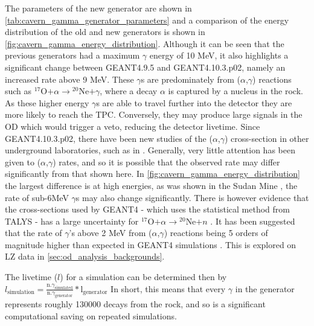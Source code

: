 \par
The parameters of the new generator are shown in \autoref{tab:cavern_gamma_generator_parameters} and a comparison of the energy distribution of the old and new generators is shown in \autoref{fig:cavern_gamma_energy_distribution}.
Although it can be seen that the previous generators had a maximum $\gamma$ energy of 10 MeV, it also highlights a significant change between GEANT4.9.5 and GEANT4.10.3.p02, namely an increased rate above 9 MeV.
These $\gamma$s are predominately from ($\alpha$,$\gamma$) reactions such as ${}^{17}$O$ + \alpha \to {}^{20}$Ne$ + \gamma$, where a decay $\alpha$ is captured by a nucleus in the rock.
As these higher energy $\gamma$s are able to travel further into the detector they are more likely to reach the TPC.
Conversely, they may produce large signals in the OD which would trigger a veto, reducing the detector livetime.
Since GEANT4.10.3.p02, there have been new studies of the ($\alpha$,$\gamma$) cross-section in other underground laboratories, such as in \cite{cavern_gammas_in_Soudan_mine_ref}.
Generally, very little attention has been given to ($\alpha$,$\gamma$) rates, and so it is possible that the observed rate may differ significantly from that shown here. 
In \autoref{fig:cavern_gamma_energy_distribution} the largest difference is at high energies, as was shown in the Sudan Mine \cite{cavern_gammas_in_Soudan_mine_ref}, the rate of sub-6MeV $\gamma$s may also change significantly. 
There is however evidence that the cross-sections used by GEANT4 - which uses the statistical method from TALYS \cite{talys_ref} - has a large uncertainty for ${}^{17}$O$ + \alpha \to {}^{20}$Ne$ + n$ \cite{alpha_gamma_statistical_error_ref}.
It has been suggested that the rate of $\gamma$'s above 2 MeV from ($\alpha$,$\gamma$) reactions being 5 orders of magnitude higher than expected in GEANT4 simulations \cite{soudanmine_counter_point_ref, alpha_gamma_reactions_ref}.
This is explored on LZ data in \autoref{sec:od_analysis_backgrounds}.

\par
The livetime ($l$) for a simulation can be determined then by $l_{\text{simulation}} = \frac{\text{n.} \gamma_{\text{simulated}}}{\text{n.} \gamma_{\text{generator}}} * \text{l}_{\text{generator}}$
In short, this means that every $\gamma$ in the generator represents roughly 130000 decays from the rock, and so is a significant computational saving on repeated simulations.


